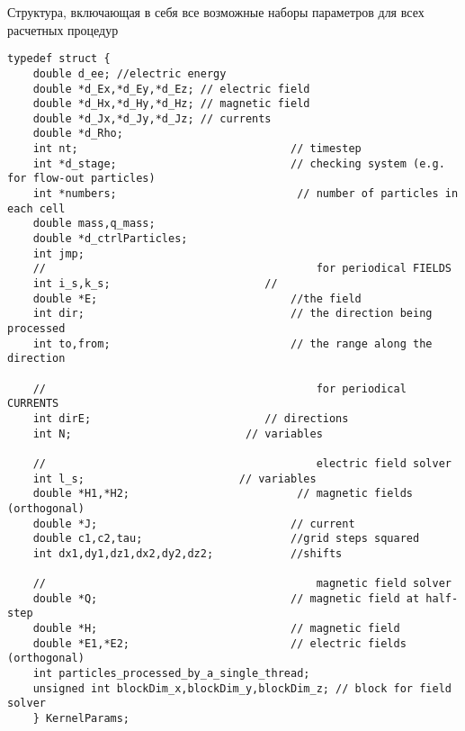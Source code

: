 \begin{ListingEnv}[!h]
\captiondelim{ } %
\caption{Структура, включающая в себя все возможные наборы параметров для всех расчетных процедур}
\label{parameter-struct}	
 \begin{lstlisting}[language={[ISO]C++}]
	typedef struct {
	double d_ee; //electric energy
	double *d_Ex,*d_Ey,*d_Ez; // electric field
	double *d_Hx,*d_Hy,*d_Hz; // magnetic field
	double *d_Jx,*d_Jy,*d_Jz; // currents
	double *d_Rho;
	int nt;                                 // timestep
	int *d_stage;                           // checking system (e.g. for flow-out particles)
	int *numbers;                            // number of particles in each cell
	double mass,q_mass;
	double *d_ctrlParticles;
	int jmp;
	//	                                        for periodical FIELDS
	int i_s,k_s;                        //
	double *E;                              //the field
	int dir;                                // the direction being processed
	int to,from;                            // the range along the direction
	
	//	                                        for periodical CURRENTS
	int dirE;                           // directions
	int N;                           // variables
	
	//                                          electric field solver
	int l_s;                        // variables
	double *H1,*H2;                          // magnetic fields (orthogonal)
	double *J;                              // current
	double c1,c2,tau;                       //grid steps squared
	int dx1,dy1,dz1,dx2,dy2,dz2;            //shifts
	
	//	                                        magnetic field solver
	double *Q;                              // magnetic field at half-step
	double *H;                              // magnetic field
	double *E1,*E2;                         // electric fields (orthogonal)
	int particles_processed_by_a_single_thread;
	unsigned int blockDim_x,blockDim_y,blockDim_z; // block for field solver
	} KernelParams;
	 \end{lstlisting}
	\end{ListingEnv}
\clearpage





